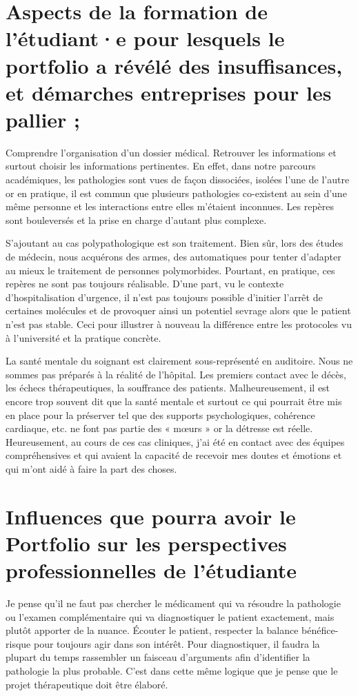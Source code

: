 \section{Aspects de la formation de l’étudiant·e pour lesquels le portfolio a révélé des insuffisances, et démarches entreprises pour les pallier ;}
Comprendre l'organisation d'un dossier médical. Retrouver les informations et surtout choisir les informations pertinentes. En effet, dans notre parcours académiques, les pathologies sont vues de façon dissociées, isolées l'une de l'autre or en pratique, il est commun que plusieurs pathologies co-existent au sein d'une même personne et les interactions entre elles m'étaient inconnues. Les repères sont bouleversés et la prise en charge d'autant plus complexe.

S'ajoutant au cas polypathologique est son traitement. Bien sûr, lors des études de médecin, nous acquérons des armes, des automatiques pour tenter d'adapter au mieux le traitement de personnes polymorbides. Pourtant, en pratique, ces repères ne sont pas toujours réalisable. D'une part, vu le contexte d'hospitalisation d'urgence, il n'est pas toujours possible d'initier l'arrêt de certaines molécules et de provoquer ainsi un potentiel sevrage alors que le patient n'est pas stable. Ceci pour illustrer à nouveau la différence entre les protocoles vu à l'université et la pratique concrète.

La santé mentale du soignant est clairement sous-représenté en auditoire. Nous ne sommes pas préparés à la réalité de l'hôpital. Les premiers contact avec le décès, les échecs thérapeutiques, la souffrance des patients. Malheureusement, il est encore trop souvent dit que la santé mentale et surtout ce qui pourrait être mis en place pour la préserver tel que des supports psychologiques, cohérence cardiaque, etc. ne font pas partie des « mœurs » or la détresse est réelle. Heureusement, au cours de ces cas cliniques, j'ai été en contact avec des équipes compréhensives et qui avaient la capacité de recevoir mes doutes et émotions et qui m'ont aidé à faire la part des choses.

\section{Influences que pourra avoir le Portfolio sur les perspectives professionnelles de l’étudiante}

Je pense qu'il ne faut pas chercher le médicament qui va résoudre la pathologie ou l'examen complémentaire qui va diagnostiquer le patient exactement, mais plutôt apporter de la nuance. Écouter le patient, respecter la balance bénéfice-risque pour toujours agir dans son intérêt. Pour diagnostiquer, il faudra la plupart du temps rassembler un faisceau d'arguments afin d'identifier la pathologie la plus probable. C'est dans cette même logique que je pense que le projet thérapeutique doit être élaboré.

